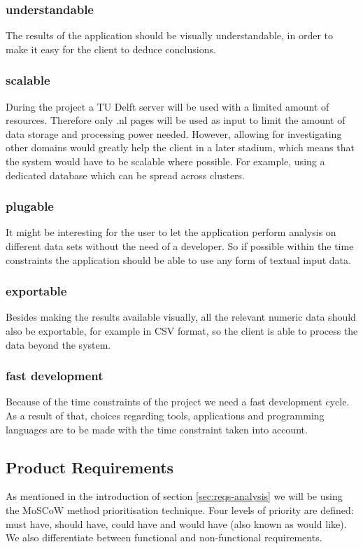 \subsubsection{understandable} The results of the application should be visually understandable, in order to make it easy for the client to deduce conclusions. 
\subsubsection{scalable} During the project a TU Delft server will be used with a limited amount of resources. Therefore only .nl pages will be used as input to limit the amount of data storage and processing power needed. However, allowing for investigating other domains would greatly help the client in a later stadium, which means that the system would have to be scalable where possible. For example, using a dedicated database which can be spread across clusters.
\subsubsection{plugable} It might be interesting for the user to let the application perform analysis on different data sets without the need of a developer. So if possible within the time constraints the application should be able to use any form of textual input data.
\subsubsection{exportable} Besides making the results available visually, all the relevant numeric data should also be exportable, for example in CSV format, so the client is able to process the data beyond the system.
\subsubsection{fast development} Because of the time constraints of the project we need a fast development cycle. As a result of that, choices regarding tools, applications and programming languages are to be made with the time constraint taken into account.


\subsection{Product Requirements}\label{sec:reqs}
As mentioned in the introduction of section \ref{sec:reqs-analysis} we will be using the MoSCoW method prioritisation technique. Four levels of priority are defined: must have, should have, could have and would have (also known as would like). We also differentiate between functional and non-functional requirements. 

